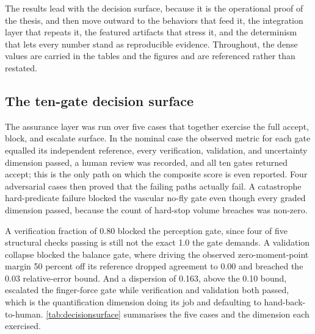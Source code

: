 
The results lead with the decision surface, because it is the operational proof
of the thesis, and then move outward to the behaviors that feed it, the
integration layer that repeats it, the featured artifacts that stress it, and the
determinism that lets every number stand as reproducible evidence. Throughout,
the dense values are carried in the tables and the figures and are referenced
rather than restated.

\subsection{The ten-gate decision surface}

The assurance layer was run over five cases that together exercise the full
accept, block, and escalate surface. In the nominal case the observed metric for
each gate equalled its independent reference, every verification, validation, and
uncertainty dimension passed, a human review was recorded, and all ten gates
returned accept; this is the only path on which the composite score is even
reported. Four adversarial cases then proved that the failing paths actually
fail. A catastrophe hard-predicate failure blocked the vascular no-fly gate even
though every graded dimension passed, because the count of hard-stop volume
breaches was non-zero. 

A verification fraction of 0.80 blocked the perception
gate, since four of five structural checks passing is still not the exact 1.0 the
gate demands. A validation collapse blocked the balance gate, where driving the
observed zero-moment-point margin 50 percent off its reference dropped agreement
to 0.00 and breached the 0.03 relative-error bound. And a dispersion of 0.163,
above the 0.10 bound, escalated the finger-force gate while verification and
validation both passed, which is the quantification dimension doing its job and
defaulting to hand-back-to-human. \autoref{tab:decisionsurface} summarises the
five cases and the dimension each exercised.

